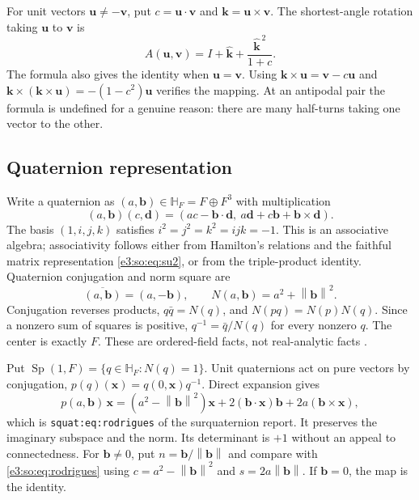 \documentclass[11pt,letterpaper]{article}
\numberwithin{equation}{section}
\theoremstyle{definition}
\theoremstyle{remark}
\newcommand{\HH}{\mathbb H}
\newcommand{\Sp}{\operatorname{Sp}}
\newcommand{\norm}[1]{\left\lVert#1\right\rVert}
\newcommand{\vv}[1]{\bm{#1}}
\begin{document}
For unit vectors $\vv u\ne-\vv v$, put $c=\vv u\cdot\vv v$ and
$\vv k=\vv u\times\vv v$. The shortest-angle rotation taking $\vv u$ to
$\vv v$ is
\begin{equation}\label{e3:eq:minimalrotation}
 A(\vv u,\vv v)=I+\widehat{\vv k}+
                   \frac{\widehat{\vv k}^{\,2}}{1+c}.
\end{equation}
The formula also gives the identity when $\vv u=\vv v$.
Using $\vv k\times\vv u=\vv v-c\vv u$ and
$\vv k\times(\vv k\times\vv u)=-(1-c^2)\vv u$ verifies the mapping.
At an antipodal pair the formula is undefined for a genuine reason: there
are many half-turns taking one vector to the other.

\subsection{Quaternion representation}\label{e3:sub:quaternions}

Write a quaternion as $(a,\vv b)\in\HH_F=F\oplus F^3$ with multiplication
\begin{equation}\label{e3:eq:quaternionmul}
 (a,\vv b)(c,\vv d)=
 (ac-\vv b\cdot\vv d,\ a\vv d+c\vv b+\vv b\times\vv d).
\end{equation}
The basis $(1,i,j,k)$ satisfies $i^2=j^2=k^2=ijk=-1$. This is an associative
algebra; associativity follows either from Hamilton's relations and the faithful
matrix representation \cref{e3:so:eq:su2}, or from the triple-product identity.
Quaternion conjugation and norm square are
\[
 \overline{(a,\vv b)}=(a,-\vv b),\qquad N(a,\vv b)=a^2+\norm{\vv b}^2.
\]
Conjugation reverses products, $q\bar q=N(q)$, and $N(pq)=N(p)N(q)$. Since a
nonzero sum of squares is positive, $q^{-1}=\bar q/N(q)$ for every nonzero $q$.
The center is exactly $F$. These are ordered-field facts, not real-analytic
facts \cite{Voight,RepoQuaternion}.

Put $\Sp(1,F)=\{q\in\HH_F:N(q)=1\}$. Unit quaternions act on pure vectors by
conjugation, $p(q)(\vv x)=q(0,\vv x)q^{-1}$. Direct expansion gives
\begin{equation}\label{e3:eq:quatrotation}
 p(a,\vv b)\,\vv x=(a^2-\norm{\vv b}^2)\vv x
       +2(\vv b\cdot\vv x)\vv b+2a(\vv b\times\vv x),
\end{equation}
which is \texttt{squat:eq:rodrigues} of the surquaternion report. It preserves
the imaginary subspace and the norm. Its determinant is $+1$ without an appeal
to connectedness. For $\vv b\ne0$, put $n=\vv b/\norm{\vv b}$ and compare with
\cref{e3:so:eq:rodrigues} using $c=a^2-\norm{\vv b}^2$ and $s=2a\norm{\vv b}$. If
$\vv b=0$, the map is the identity.
\end{document}

